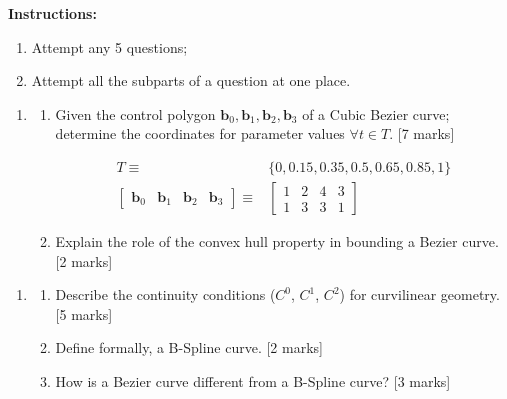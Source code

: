 \documentclass[11pt,a4paper,onecolumn]{tiet-question-paper}
\date{8 December 2026}
\institute{Riverside Institute of Technology}
\begin{document}
\maketitle
\textbf{Instructions:}
\begin{enumerate}
\item Attempt any 5 questions;
\item Attempt all the subparts of a question at one
  place.
\end{enumerate}
\bvrhrule[0.4pt]
\begin{enumerate}
\item
  \begin{enumerate}
  \item Given the control polygon
    $\textbf{b}_0, \textbf{b}_1, \textbf{b}_2,
    \textbf{b}_3$ of a Cubic Bezier curve; determine
    the coordinates for parameter values
    $\forall t\in T$. \hfill [7 marks]

    \begin{align*}
      T \equiv
      & \{0, 0.15, 0.35, 0.5, 0.65, 0.85, 1\} \\
      \begin{bmatrix}
        \textbf{b}_0 &\textbf{b}_1& \textbf{b}_2& \textbf{b}_3
      \end{bmatrix} \equiv
      & \begin{bmatrix}
        1&2&4&3\\ 1&3&3&1
      \end{bmatrix}
    \end{align*}
  \item Explain the role of the convex hull property in
    bounding a Bezier curve. \hfill[2 marks]
  \end{enumerate}
\end{enumerate}
\bvrhrule[0.4pt]
\begin{enumerate}[resume]
\item
  \begin{enumerate}
  \item Describe the continuity conditions
    ($C^0$, $C^1$, $C^2$) for curvilinear geometry.
    \hfill[5 marks]
  \item Define formally, a B-Spline curve. \hfill [2
    marks]
  \item How is a Bezier curve different from a B-Spline
    curve? \hfill [3 marks]
  \end{enumerate}
\end{enumerate}
\bvrhrule[0.4pt]
\end{document}
